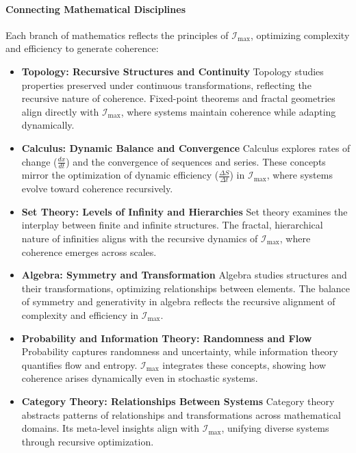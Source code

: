 \documentclass[12pt]{article}
\begin{document}
\paragraph{Connecting Mathematical Disciplines}
Each branch of mathematics reflects the principles of \(\mathcal{I}_{\text{max}}\), optimizing complexity and efficiency to generate coherence:
\begin{itemize}
    \item \textbf{Topology: Recursive Structures and Continuity}  
    Topology studies properties preserved under continuous transformations, reflecting the recursive nature of coherence. Fixed-point theorems and fractal geometries align directly with \(\mathcal{I}_{\text{max}}\), where systems maintain coherence while adapting dynamically.
    
    \item \textbf{Calculus: Dynamic Balance and Convergence}  
    Calculus explores rates of change (\(\frac{dx}{dt}\)) and the convergence of sequences and series. These concepts mirror the optimization of dynamic efficiency (\(\frac{\Delta S}{\Delta t}\)) in \(\mathcal{I}_{\text{max}}\), where systems evolve toward coherence recursively.

    \item \textbf{Set Theory: Levels of Infinity and Hierarchies}  
    Set theory examines the interplay between finite and infinite structures. The fractal, hierarchical nature of infinities aligns with the recursive dynamics of \(\mathcal{I}_{\text{max}}\), where coherence emerges across scales.

    \item \textbf{Algebra: Symmetry and Transformation}  
    Algebra studies structures and their transformations, optimizing relationships between elements. The balance of symmetry and generativity in algebra reflects the recursive alignment of complexity and efficiency in \(\mathcal{I}_{\text{max}}\).

    \item \textbf{Probability and Information Theory: Randomness and Flow}  
    Probability captures randomness and uncertainty, while information theory quantifies flow and entropy. \(\mathcal{I}_{\text{max}}\) integrates these concepts, showing how coherence arises dynamically even in stochastic systems.

    \item \textbf{Category Theory: Relationships Between Systems}  
    Category theory abstracts patterns of relationships and transformations across mathematical domains. Its meta-level insights align with \(\mathcal{I}_{\text{max}}\), unifying diverse systems through recursive optimization.
\end{itemize}
\end{document}

